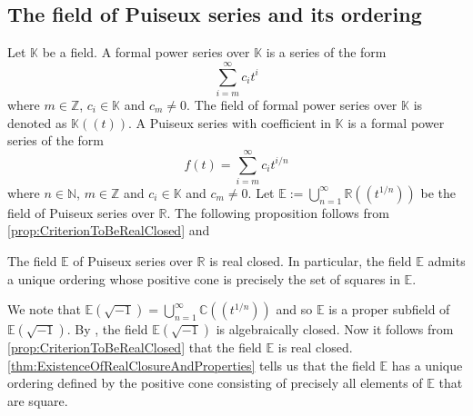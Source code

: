 \documentclass{amsart}
\makeatletter
\renewenvironment{proof}[1][\proofname]{%
   \par\pushQED{\qed}\normalfont%
   \topsep6\p@\@plus6\p@\relax
   \trivlist\item[\hskip\labelsep\bfseries#1\@addpunct{.}]%
   \ignorespaces
}{%
   \popQED\endtrivlist\@endpefalse
}
\makeatother
\begin{document}
\subsection{The field of Puiseux series and its ordering} \label{subsec:puiseux}

Let $\mathbb{K}$ be a field. A formal power series over $\mathbb{K}$ is a series of the form
\[
\sum_{i = m}^\infty c_i t^{i}
\]
where $m\in \mathbb{Z}$, $c_i \in \mathbb{K}$ and $c_m \neq 0$. The field of formal power series over $\mathbb{K}$ is denoted as $\mathbb{K}((t))$. A Puiseux series with coefficient in $\mathbb{K}$ is a formal power series of the form
\[
f(t) = \sum_{i = m}^\infty c_i t^{i/n}
\]
where $n\in \mathbb{N}$, $m\in \mathbb{Z}$ and $c_i \in \mathbb{K}$ and $c_m \neq 0$. Let $\displaystyle\mathbb{E} := \bigcup_{n=1}^\infty \mathbb{R}((t^{1/n}))$ be the field of Puiseux series over $\mathbb{R}$. The following proposition follows from \cref{prop:CriterionToBeRealClosed} and \cite[Chapter IV, \S 2, Proposition 8]{SerreLocalFields}

\begin{prop}
\label{prop:EIsRealClosed}
    The field $\mathbb{E}$ of Puiseux series over $
\mathbb{R}$ is real closed. In particular, the field $\mathbb{E}$ admits a unique ordering whose positive cone is precisely the set of squares in $\mathbb{E}.$
\end{prop}

\begin{proof}
    We note that $\displaystyle\mathbb{E}(\sqrt{-1}) = \bigcup_{n=1}^\infty\mathbb{C}((t^{1/n}))$ and so $\mathbb{E}$ is a proper subfield of $\mathbb{E}(\sqrt{-1})$. By \cite[Chapter IV, \S 2, Proposition 8]{SerreLocalFields}, the field $\displaystyle\mathbb{E}(\sqrt{-1})$ is algebraically closed. Now it follows from \cref{prop:CriterionToBeRealClosed} that the field $\mathbb{E}$ is real closed. \cref{thm:ExistenceOfRealClosureAndProperties} tells us that the field $\mathbb{E}$ has a unique ordering defined by the positive cone consisting of precisely all elements of $\mathbb{E}$ that are square.   
\end{proof}
\end{document}
